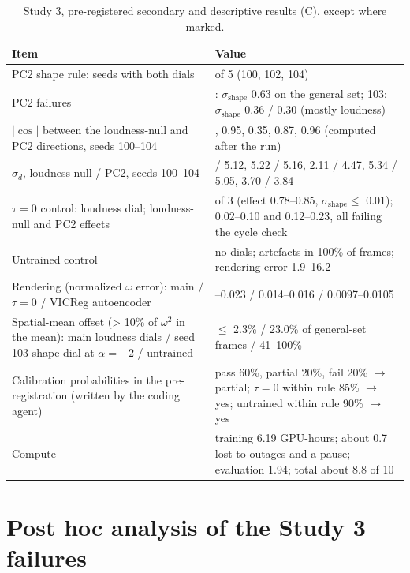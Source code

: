 \documentclass[10pt]{article}
\begin{document}
\begin{table}[htbp]
\centering
\small
\caption{Study 3, pre-registered secondary and descriptive results (C), except where marked.}
\label{tab:D1}
\begin{tabularx}{\linewidth}{>{\raggedright\arraybackslash}X>{\raggedright\arraybackslash}X}
\toprule
Item & Value \\
\midrule
PC2 shape rule: seeds with both dials & 3 of 5 (100, 102, 104) \\
PC2 failures & 101: $\sigma_{\mathrm{shape}}$ 0.63 on the general set; 103: $\sigma_{\mathrm{shape}}$ 0.36 / 0.30 (mostly loudness) \\
$|\cos|$ between the loudness-null and PC2 directions, seeds 100--104 & 0.99, 0.95, 0.35, 0.87, 0.96 (computed after the run) \\
$\sigma_d$, loudness-null / PC2, seeds 100--104 & 5.12 / 5.12, 5.22 / 5.16, 2.11 / 4.47, 5.34 / 5.05, 3.70 / 3.84 \\
$\tau = 0$ control: loudness dial; loudness-null and PC2 effects & 3 of 3 (effect 0.78--0.85, $\sigma_{\mathrm{shape}} \leq$ 0.01); 0.02--0.10 and 0.12--0.23, all failing the cycle check \\
Untrained control & no dials; artefacts in 100\% of frames; rendering error 1.9--16.2 \\
Rendering (normalized $\omega$ error): main / $\tau = 0$ / VICReg autoencoder & 0.021--0.023 / 0.014--0.016 / 0.0097--0.0105 \\
Spatial-mean offset (> 10\% of $\omega^2$ in the mean): main loudness dials / seed 103 shape dial at $\alpha = -2$ / untrained & $\leq$ 2.3\% / 23.0\% of general-set frames / 41--100\% \\
Calibration probabilities in the pre-registration (written by the coding agent) & pass 60\%, partial 20\%, fail 20\% $\rightarrow$ partial; $\tau = 0$ within rule 85\% $\rightarrow$ yes; untrained within rule 90\% $\rightarrow$ yes \\
Compute & training 6.19 GPU-hours; about 0.7 lost to outages and a pause; evaluation 1.94; total about 8.8 of 10 \\
\bottomrule
\end{tabularx}
\end{table}

\section{Post hoc analysis of the Study 3 failures}\label{app:E}
\end{document}
